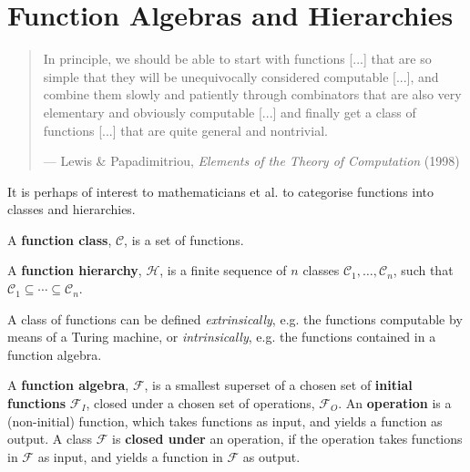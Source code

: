 \chapter{Function Algebras and Hierarchies}

\begin{quotation}

\footnotesize\sffamily\itshape

\begin{flushright}

In principle, we should be able to start with functions [...] that are so
simple that they will be unequivocally considered computable [...], and combine
them slowly and patiently through combinators that are also very elementary and
obviously computable [...] and finally get a class of functions [...] that are
quite general and nontrivial.

\smallbreak

\upshape

--- Lewis \& Papadimitriou, \emph{Elements of the Theory of Computation} (1998)

\end{flushright}

\end{quotation}

It is perhaps of interest to mathematicians et al. to categorise functions into
classes and hierarchies.

\begin{definition} A \textbf{function class}, $\mathcal{C}$, is a set of
functions.  \end{definition}

\begin{definition} A \textbf{function hierarchy}, $\mathcal{H}$, is a finite
sequence of $n$ classes $\mathcal{C}_1, \ldots, \mathcal{C}_n$, such that
$\mathcal{C}_1 \subseteq \cdots \subseteq \mathcal{C}_n$.
\end{definition}

A class of functions can be defined \emph{extrinsically}, e.g.  the functions
computable by means of a Turing machine, or \emph{intrinsically}, e.g. the
functions contained in a function algebra.

\begin{definition} A \textbf{function algebra}, $\mathcal{F}$, is a smallest
superset of a chosen set of \textbf{initial functions} $\mathcal{F}_I$, closed
under a chosen set of operations, $\mathcal{F}_O$. An \textbf{operation} is a
(non-initial) function, which takes functions as input, and yields a function
as output. A class $\mathcal{F}$ is \textbf{closed under} an operation, if the
operation takes functions in $\mathcal{F}$ as input, and yields a function in
$\mathcal{F}$ as output. \end{definition}

